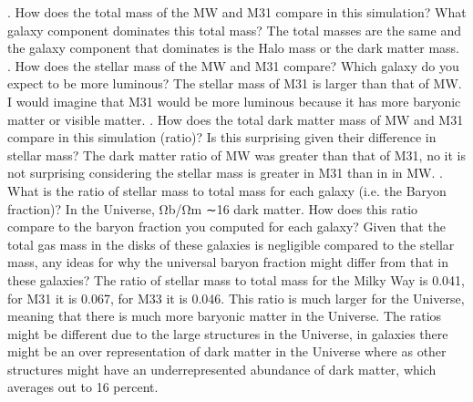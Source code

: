 \documentclass{article}
\begin{document}
. How does the total mass of the MW and M31 compare in this simulation? What galaxy component dominates this total mass? 
\newline
\newline
The total masses are the same and the galaxy component that dominates is the Halo mass or the dark matter mass.
\newline
{}. How does the stellar mass of the MW and M31 compare? Which galaxy do you expect to be more luminous? 
\newline
\newline
The stellar mass of M31 is larger than that of MW. I would imagine that M31 would be more luminous because it has more baryonic matter or visible matter.
\newline
{}. How does the total dark matter mass of MW and M31 compare in this simulation (ratio)? Is this surprising given their difference in stellar mass?  
\newline
\newline
The dark matter ratio of MW was greater than that of M31, no it is not surprising considering the stellar mass is greater in M31 than in in MW.
\newline
{}. What is the ratio of stellar mass to total mass for each galaxy (i.e. the Baryon fraction)?
In the Universe, Ωb/Ωm ∼16%
dark matter. How does this ratio compare to the baryon fraction you computed for
each galaxy? Given that the total gas mass in the disks of these galaxies is negligible
compared to the stellar mass, any ideas for why the universal baryon fraction might
differ from that in these galaxies?
\newline
\newline
The ratio of stellar mass to total mass for the Milky Way is 0.041, for M31 it is 0.067, for M33 it is 0.046. This ratio is much larger for the Universe, meaning that there is much more baryonic matter in the Universe. The ratios might be different due to the large structures in the Universe, in galaxies there might be an over representation of dark matter in the Universe where as other structures might have an underrepresented abundance of dark matter, which averages out to 16 percent. 
\end{document}
